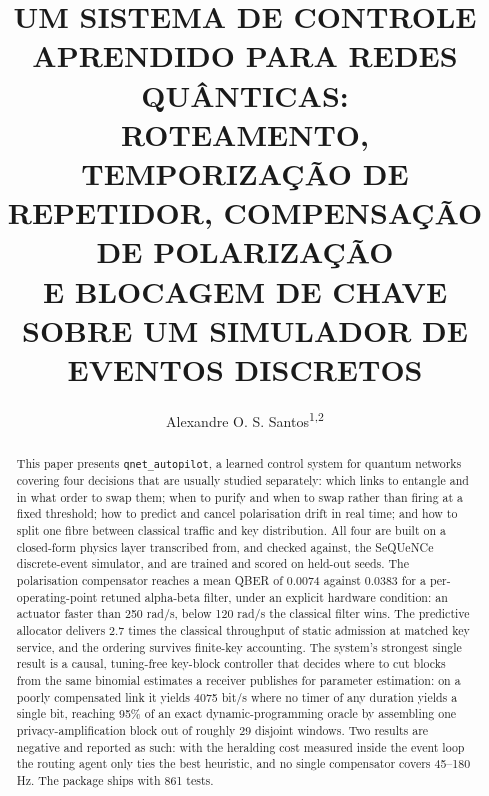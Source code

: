 \documentclass[12pt]{article}
\title{UM SISTEMA DE CONTROLE APRENDIDO PARA REDES QUÂNTICAS:\\
ROTEAMENTO, TEMPORIZAÇÃO DE REPETIDOR, COMPENSAÇÃO DE POLARIZAÇÃO\\
E BLOCAGEM DE CHAVE SOBRE UM SIMULADOR DE EVENTOS DISCRETOS}
\author{Alexandre O. S. Santos\textsuperscript{1,2}}
\begin{document}
\maketitle

\address{\textsuperscript{1}Quantum Industrial Innovation -- QuIIN\\
Senai CIMATEC -- Salvador, BA -- Brazil
\nextinstitute
\textsuperscript{2}Latin America Quantum Computing Center -- LAQCC\\
Senai CIMATEC -- Salvador, BA -- Brazil}


\begin{abstract}
This paper presents \texttt{qnet\_autopilot}, a learned control system for
quantum networks covering four decisions that are usually studied separately:
which links to entangle and in what order to swap them; when to purify and when
to swap rather than firing at a fixed threshold; how to predict and cancel
polarisation drift in real time; and how to split one fibre between classical
traffic and key distribution. All four are built on a closed-form physics layer
transcribed from, and checked against, the SeQUeNCe discrete-event simulator,
and are trained and scored on held-out seeds. The polarisation compensator
reaches a mean QBER of 0.0074 against 0.0383 for a per-operating-point retuned
alpha-beta filter, under an explicit hardware condition: an actuator faster
than 250 rad/s, below 120 rad/s the classical filter wins. The predictive
allocator delivers 2.7 times the classical throughput of static admission at
matched key service, and the ordering survives finite-key accounting. The
system's strongest single result is a causal, tuning-free key-block controller
that decides where to cut blocks from the same binomial estimates a receiver
publishes for parameter estimation: on a poorly compensated link it yields
4075 bit/s where no timer of any duration yields a single bit, reaching 95\% of
an exact dynamic-programming oracle by assembling one privacy-amplification
block out of roughly 29 disjoint windows. Two results are negative and
reported as such: with the heralding cost measured inside the event loop the
routing agent only ties the best heuristic, and no single compensator covers
45--180 Hz. The package ships with 861 tests.
\end{abstract}

\end{document}
